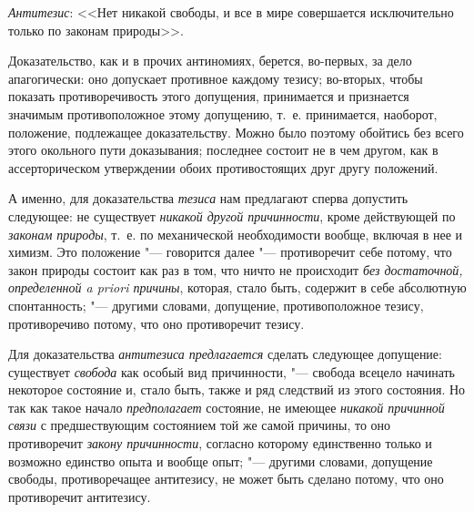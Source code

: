 {{{\em Антитезис}: <<Нет
никакой свободы, и все в мире совершается исключительно только по законам
природы>>.

Доказательство, как и в прочих антиномиях, берется, во-первых,
за дело апагогически: оно допускает противное каждому тезису; во-вторых,
чтобы показать противоречивость этого допущения, принимается и признается
значимым противоположное этому допущению, т.~е. принимается, наоборот,
положение, подлежащее доказательству. Можно было поэтому обойтись без всего
этого окольного пути доказывания; последнее состоит не в чем другом, как в
ассерторическом утверждении обоих противостоящих друг другу положений.

А именно, для доказательства
{\em тезиса} нам
предлагают сперва допустить следующее: не существует
{\em никакой другой причинности},
кроме действующей по
{\em законам природы},
т.~е. по механической необходимости вообще, включая в нее и
химизм. Это положение "--- говорится далее
"--- противоречит себе потому, что закон природы состоит как раз
в том, что ничто не происходит {\em без
достаточной, определенной a priori причины}, которая, стало
быть, содержит в себе абсолютную спонтанность; "--- другими
словами, допущение, противоположное тезису, противоречиво потому, что оно
противоречит тезису.

Для доказательства
{\em антитезиса предлагается}
сделать следующее допущение: существует
{\em свобода} как особый
вид причинности, "--- свобода всецело начинать некоторое
состояние и, стало быть, также и ряд следствий из этого состояния. Но так
как такое начало {\em предполагает}
состояние, не имеющее
{\em никакой причинной связи}
с предшествующим состоянием той же самой причины, то оно
противоречит {\em закону причинности},
согласно которому единственно только и возможно единство
опыта и вообще опыт; "--- другими словами, допущение свободы,
противоречащее антитезису, не может быть сделано потому, что оно
противоречит антитезису.

}}
